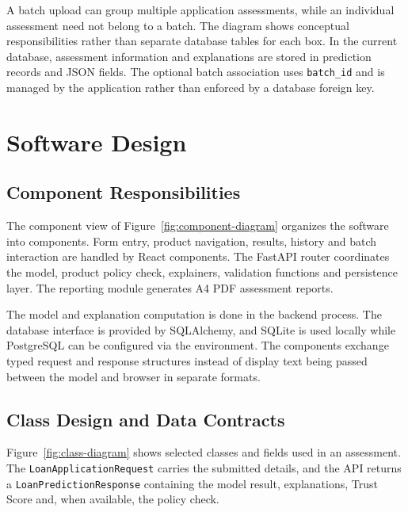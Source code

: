 A batch upload can group multiple application assessments, while an individual assessment need not belong to a batch. The diagram shows conceptual responsibilities rather than separate database tables for each box. In the current database, assessment information and explanations are stored in prediction records and JSON fields. The optional batch association uses \texttt{batch\_id} and is managed by the application rather than enforced by a database foreign key.

\clearpage

\section{Software Design}
\subsection{Component Responsibilities}
The component view of Figure~\ref{fig:component-diagram} organizes the software into components. Form entry, product navigation, results, history and batch interaction are handled by React components. The FastAPI router coordinates the model, product policy check, explainers, validation functions and persistence layer. The reporting module generates A4 PDF assessment reports.

The model and explanation computation is done in the backend process. The database interface is provided by SQLAlchemy, and SQLite is used locally while PostgreSQL can be configured via the environment. The components exchange typed request and response structures instead of display text being passed between the model and browser in separate formats.


\subsection{Class Design and Data Contracts}
Figure~\ref{fig:class-diagram} shows selected classes and fields used in an assessment. The \texttt{LoanApplicationRequest} carries the submitted details, and the API returns a \texttt{LoanPredictionResponse} containing the model result, explanations, Trust Score and, when available, the policy check.

